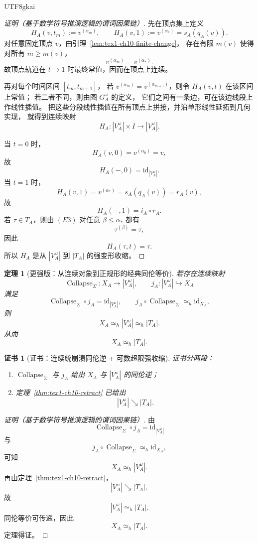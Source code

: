 \documentclass[12pt]{article}
\newtheorem{theorem}{定理}[section]
\newtheorem{Certificate}{证书}[section]
\newcommand{\Collapse}{\operatorname{Collapse}}
\newcommand{\id}{\mathrm{id}}
\begin{document}
\begin{CJK*}{UTF8}{gkai}
\begin{proof}[证明（基于数学符号推演逻辑的谓词因果链）]
先在顶点集上定义
\[
  H_A(v,t_m):=v^{(\alpha_m)},
  \qquad
  H_A(v,1):=v^{(\alpha_\ast)}=s_A(q_A(v)).
\]
对任意固定顶点 \(v\)，由引理~\ref{lem:tex1-ch10-finite-change}，
存在有限 \(m(v)\) 使得对所有 \(m\ge m(v)\)，
\[
  v^{(\alpha_m)}=v^{(\alpha_\ast)}.
\]
故顶点轨道在 \(t\to 1\) 时最终常值，因而在顶点上连续。

再对每个时间区间 \([t_m,t_{m+1}]\)，
若 \(v^{(\alpha_m)}=v^{(\alpha_{m+1})}\)，则令 \(H_A(v,t)\) 在该区间上常值；
若二者不同，则由图 \(G_A^\omega\) 的定义，
它们之间有一条边，可在该边线段上作线性插值。
把这些分段线性插值在所有顶点上拼接，并沿单形线性延拓到几何实现，
就得到连续映射
\[
  H_A:|V_A^\omega|\times I\to |V_A^\omega|.
\]

当 \(t=0\) 时，
\[
  H_A(v,0)=v^{(\alpha_0)}=v,
\]
故
\[
  H_A(-,0)=\id_{|V_A^\omega|}.
\]
当 \(t=1\) 时，
\[
  H_A(v,1)=v^{(\alpha_\ast)}=s_A(q_A(v))=r_A(v),
\]
故
\[
  H_A(-,1)=i_A\circ r_A.
\]
若 \(\tau\in T_A\)，则由 \((E3)\) 对任意 \(\beta\le \alpha_\ast\) 都有
\[
  \tau^{(\beta)}=\tau,
\]
因此
\[
  H_A(\tau,t)=\tau.
\]
所以 \(H_A\) 是从 \(|V_A^\omega|\) 到 \(|T_A|\) 的强变形收缩。
\end{proof}

\begin{theorem}[更强版：从连续对象到正规形的经典同伦等价]
\label{thm:tex1-ch10-collapse-equivalence}
若存在连续映射
\[
  \Collapse_{\Sigma}:X_A\to |V_A^\omega|,
  \qquad
  j_A:|V_A^\omega|\hookrightarrow X_A
\]
满足
\[
  \Collapse_{\Sigma}\circ j_A=\id_{|V_A^\omega|},
  \qquad
  j_A\circ \Collapse_{\Sigma}\simeq_h \id_{X_A},
\]
则
\[
  \boxed{
    X_A \simeq_h |V_A^\omega| \simeq_h |T_A|.
  }
\]
从而
\[
  \boxed{
    X_A \simeq_h |T_A|.
  }
\]
\end{theorem}

\begin{Certificate}[证书：连续统崩溃同伦逆 + 可数超限强收缩]
\label{cert:tex1-ch10-collapse-equivalence}
证书分两段：
\begin{enumerate}
  \item \(\Collapse_{\Sigma}\) 与 \(j_A\) 给出 \(X_A\) 与 \(|V_A^\omega|\) 的同伦逆；
  \item 定理~\ref{thm:tex1-ch10-retract} 已给出
  \[
    |V_A^\omega|\searrow |T_A|.
  \]
\end{enumerate}
\end{Certificate}

\begin{proof}[证明（基于数学符号推演逻辑的谓词因果链）]
由
\[
  \Collapse_{\Sigma}\circ j_A=\id_{|V_A^\omega|}
\]
与
\[
  j_A\circ \Collapse_{\Sigma}\simeq_h \id_{X_A},
\]
可知
\[
  X_A\simeq_h |V_A^\omega|.
\]
再由定理~\ref{thm:tex1-ch10-retract}，
\[
  |V_A^\omega|\searrow |T_A|,
\]
故
\[
  |V_A^\omega|\simeq_h |T_A|.
\]
同伦等价可传递，因此
\[
  X_A\simeq_h |T_A|.
\]
定理得证。
\end{proof}


\end{CJK*}
\end{document}

